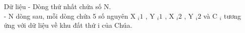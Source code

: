 Dữ liệu
- Dòng thứ nhất chứa số N.
\\- N dòng sau, mỗi dòng chứa 5 số nguyên X $_ i1 $ , Y $_ i1 $ , X $_ i2 $ , Y $_ i2 $ và C $_ i $ tương ứng với dữ liệu về khu đất thứ i của Chúa.